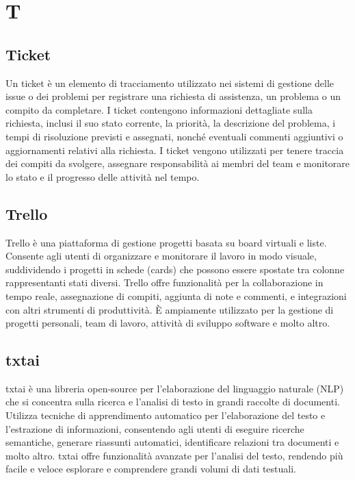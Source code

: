 \section{T}


\vspace{2em}
\subsection*{Ticket}
Un ticket è un elemento di tracciamento utilizzato nei sistemi di gestione delle issue o dei problemi per registrare una richiesta di assistenza, un problema o un compito da completare. I ticket contengono informazioni dettagliate sulla richiesta, inclusi il suo stato corrente, la priorità, la descrizione del problema, i tempi di risoluzione previsti e assegnati, nonché eventuali commenti aggiuntivi o aggiornamenti relativi alla richiesta. I ticket vengono utilizzati per tenere traccia dei compiti da svolgere, assegnare responsabilità ai membri del team e monitorare lo stato e il progresso delle attività nel tempo.

\vspace{2em}
\subsection*{Trello}
Trello è una piattaforma di gestione progetti basata su board virtuali e liste. Consente agli utenti di organizzare e monitorare il lavoro in modo visuale, suddividendo i progetti in schede (cards) che possono essere spostate tra colonne rappresentanti stati diversi. Trello offre funzionalità per la collaborazione in tempo reale, assegnazione di compiti, aggiunta di note e commenti, e integrazioni con altri strumenti di produttività. È ampiamente utilizzato per la gestione di progetti personali, team di lavoro, attività di sviluppo software e molto altro.

\vspace{2em}
\subsection*{txtai}
txtai è una libreria open-source per l'elaborazione del linguaggio naturale (NLP) che si concentra sulla ricerca e l'analisi di testo in grandi raccolte di documenti. Utilizza tecniche di apprendimento automatico per l'elaborazione del testo e l'estrazione di informazioni, consentendo agli utenti di eseguire ricerche semantiche, generare riassunti automatici, identificare relazioni tra documenti e molto altro. txtai offre funzionalità avanzate per l'analisi del testo, rendendo più facile e veloce esplorare e comprendere grandi volumi di dati testuali.
